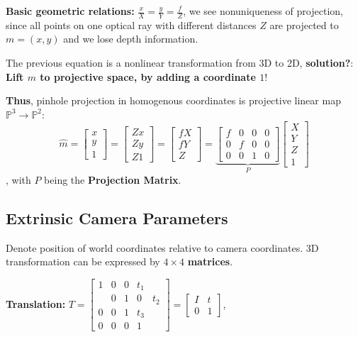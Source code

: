 \textbf{Basic geometric relations:} $\frac{x}{X} = \frac{y}{Y} = \frac{f}{Z}$, we see nonuniqueness of projection, since all points on one optical ray with different distances $Z$ are projected to $m = (x,y)$ and we lose depth information.

The previous equation is a nonlinear transformation from 3D to 2D, \textbf{solution?}: \textbf{Lift $m$ to projective space, by adding a coordinate $1$}!

\textbf{Thus}, pinhole projection in homogenous coordinates is projective linear map 
$\mathbb{P}^3 \rightarrow \mathbb{P}^2$: $$\hat{m} = \left[\begin{matrix}
x \\ y \\ 1
\end{matrix}\right] =\left[\begin{matrix}
Zx \\ Zy \\ Z1
\end{matrix}\right] = \left[\begin{matrix}
fX \\ fY \\ Z
\end{matrix}\right] = \underset{P}{\underbrace{\left[\begin{matrix}
f & 0 & 0 & 0 \\ 0 & f & 0 & 0 \\ 0 & 0 & 1 & 0
\end{matrix}\right]}}
\left[\begin{matrix}
X \\ Y \\ Z \\ 1
\end{matrix}\right]$$, with $P$ being the \textbf{Projection Matrix}.

\subsection{Extrinsic Camera Parameters}

Denote position of world coordinates relative to camera coordinates. 3D transformation can be expressed by $4\times 4$ \textbf{matrices}.

\textbf{Translation:} $T = \left[\begin{matrix}
1 & 0 & 0 & t_1 \\ & 0 & 1 & 0 & t_2 \\ 0 & 0 & 1 & t_3 \\ 0 & 0 & 0 & 1
\end{matrix}\right] = \left[ \begin{matrix} I & t \\ 0 & 1 \end{matrix} \right]$,

